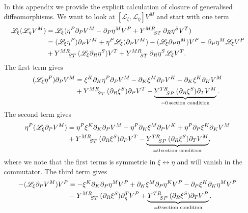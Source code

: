 In this appendix we provide the explicit calculation of closure of generalised diffeomorphisms. We want to look at $[\mathscr{L}_\xi,\mathscr{L}_\eta] V^M$ and start with one term 
\begin{equation}
    \begin{aligned}
        \mathscr{L}_{\xi}(\mathscr{L}_\eta V^M) &= \mathscr{L}_\xi(\eta^P\pd_PV^M-\pd_P\eta^MV^P+\tensor{Y}{^{MR}_{ST}}\pd_R\eta^S V^T)\\
        &= (\mathscr{L}_\xi \eta^P)\pd_PV^M+\eta^P\mathscr{L}_\xi(\pd_PV^M)-(\mathscr{L}_\xi\pd_P\eta^M)V^P-\pd_P\eta^M\mathscr{L}_\xi V^P\\
        &+\tensor{Y}{^{MR}_{ST}}(\mathscr{L}_\xi\pd_R\eta^S)V^T+\tensor{Y}{^{MR}_{ST}}\pd_R\eta^S\mathscr{L}_\xi V^T.
    \end{aligned}
\end{equation}
The first term gives 
\begin{equation}
    \begin{aligned}
        (\mathscr{L}_\xi\eta^P)\pd_PV^M &= \xi^K\pd_K\eta^P\pd_PV^M-\pd_K\xi^M\pd_PV^K+\pd_K\xi^K\pd_KV^M\\
        &+\tensor{Y}{^{MR}_{ST}}(\pd_R\xi^S)\pd_PV^T-\underbrace{\tensor{Y}{^{TR}_{SP}}(\pd_R\xi^S)\pd_TV^M}_{=0\,\text{section condition}}.
    \end{aligned}
\end{equation}
The second term gives 
\begin{equation}
    \begin{aligned}
        \eta^P(\mathscr{L}_\xi\pd_PV^M) &= \eta^P\xi^K\pd_K\pd_PV^M-\eta^P\pd_K\xi^M\pd_PV^K+\eta^P\pd_P\xi^K\pd_KV^M\\
        &+ \tensor{Y}{^{MR}_{ST}}(\pd_R\xi^S)\pd_PV^T-\underbrace{\tensor{Y}{^{TR}_{SP}}(\pd_R\xi^S)\pd_TV^M}_{=0\, \text{section condition}},
    \end{aligned}
\end{equation}
where we note that the first terms is symmetric in $\xi\leftrightarrow\eta$ and will vanish in the commutator. The third term gives 
\begin{equation}
    \begin{aligned}
        -(\mathscr{L}_\xi\pd_PV^M)V^P&=-\xi^K\pd_K\pd_P\eta^MV^P+\pd_K\xi^M\pd_P\eta^KV^P-\pd_P\xi^K\pd_K\eta^MV^P\\
        &-\tensor{Y}{^{MR}_{ST}}(\pd_R\xi^S)\pd_\eta^TV^P+\underbrace{\tensor{Y}{^{TR}_{SP}}(\pd_R\xi^S)\pd_TV^P}_{=0\, \text{section condition}}.
    \end{aligned}
\end{equation}
